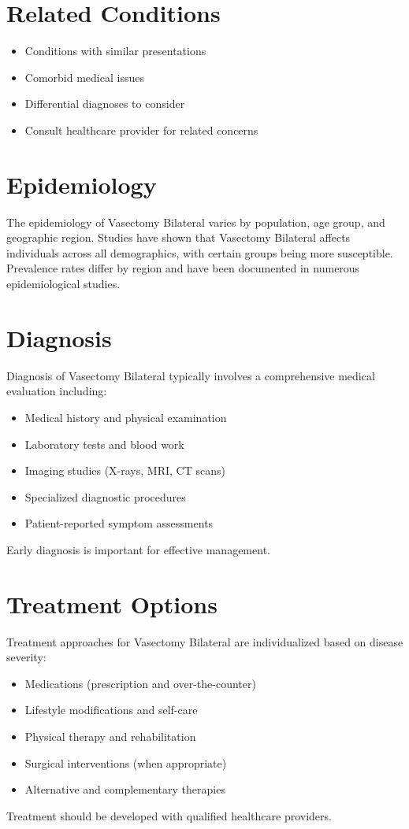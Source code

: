 \section*{Related Conditions}
\begin{itemize}
  \item Conditions with similar presentations
  \item Comorbid medical issues
  \item Differential diagnoses to consider
  \item Consult healthcare provider for related concerns
\end{itemize}

\section*{Epidemiology}
The epidemiology of Vasectomy Bilateral varies by population, age group, and geographic region. Studies have shown that Vasectomy Bilateral affects individuals across all demographics, with certain groups being more susceptible. Prevalence rates differ by region and have been documented in numerous epidemiological studies.

\section*{Diagnosis}
Diagnosis of Vasectomy Bilateral typically involves a comprehensive medical evaluation including:
\begin{itemize}
  \item Medical history and physical examination
  \item Laboratory tests and blood work
  \item Imaging studies (X-rays, MRI, CT scans)
  \item Specialized diagnostic procedures
  \item Patient-reported symptom assessments
\end{itemize}
Early diagnosis is important for effective management.

\section*{Treatment Options}
Treatment approaches for Vasectomy Bilateral are individualized based on disease severity:
\begin{itemize}
  \item Medications (prescription and over-the-counter)
  \item Lifestyle modifications and self-care
  \item Physical therapy and rehabilitation
  \item Surgical interventions (when appropriate)
  \item Alternative and complementary therapies
\end{itemize}
Treatment should be developed with qualified healthcare providers.

